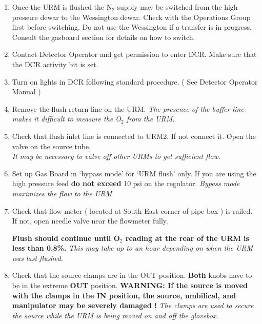 \begin{enumerate}
\item Once the URM is flushed the N$_2$ supply may be switched from the high
pressure dewar to the Wessington dewar. Check with the Operations Group first
before switching. Do not use the Wessington if a transfer is in progress.
Consult the gasboard section for details on how to switch.


\item\checkbox Contact Detector Operator and get permission to enter DCR. Make sure
that the DCR activity bit is set.


\item\checkbox Turn on lights in DCR following standard procedure. ( See Detector Operator
Manual )

\item\checkbox Remove the flush return line on the URM.
  \small
  {\em The presence of the buffer line makes it difficult to measure the O$_2$ from
the URM.
  }
  \normalsize


\item\checkbox Check that flush inlet line is connected to URM2.  If not
  connect it. Open the valve on the source tube.\\
  \small
  {\em It may be necessary to valve off other URMs to get sufficient flow.
  }
  \normalsize

\item\checkbox Set up Gas Board in `bypass mode' for `URM flush' only. If you are
using the high pressure feed {\bf do not exceed } 10 psi on the regulator.
  \small
  {\em Bypass mode maximizes the flow to the URM.
  }
  \normalsize


\item\checkbox Check that flow meter ( located at South-East corner of
pipe box ) is railed. If not, open needle valve near the flowmeter fully.

   {\bf Flush should continue until O$_2$ reading at the rear of the URM is less than 0.8\%.}
   \small
   {\em
     This may take up to an hour depending on when the URM was last
     flushed.
   }
   \normalsize



\item\checkbox Check that the source clamps are in the OUT position.
{\bf Both } knobs have to be in the extreme {\bf OUT} position.
{\bf
     WARNING:  If the source is moved with the clamps in the {\bf IN} position,
       the source, umbilical,
     and manipulator may be severely damaged !
   }
  \small
  {\em
   The clamps are used to secure the source while the URM is being moved
   on and off the glovebox.
  }
  \normalsize



\end{enumerate}
